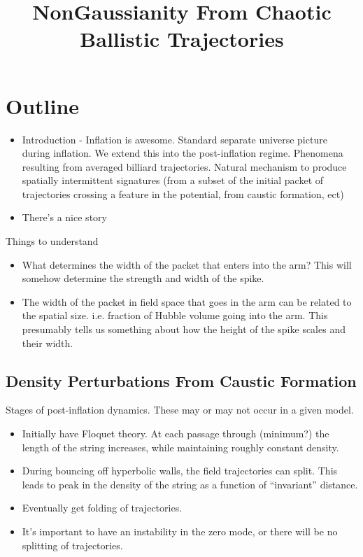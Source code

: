 \documentclass[11pt,a4paper]{article}
\begin{document}
\title{NonGaussianity From Chaotic Ballistic Trajectories}

\maketitle

\section{Outline}
\begin{itemize}
\item Introduction - Inflation is awesome.  Standard separate universe picture during inflation.  We extend this into the post-inflation regime.  Phenomena resulting from averaged billiard trajectories.  Natural mechanism to produce spatially intermittent signatures (from a subset of the initial packet of trajectories crossing a feature in the potential, from caustic formation, ect)
\item There's a nice story 
\end{itemize}










Things to understand
\begin{itemize}
\item What determines the width of the packet that enters into the arm?  This will somehow determine the strength and width of the spike.
\item The width of the packet in field space that goes in the arm can be related to the spatial size.  i.e. fraction of Hubble volume going into the arm.  This presumably tells us something about how the height of the spike scales and their width.
\end{itemize}

\subsection{Density Perturbations From Caustic Formation}
Stages of post-inflation dynamics.  These may or may not occur in a given model.
\begin{itemize}
\item Initially have Floquet theory.  At each passage through (minimum?) the length of the string increases, while maintaining roughly constant density.
\item During bouncing off hyperbolic walls, the field trajectories can split.  This leads to peak in the density of the string as a function of ``invariant'' distance.
\item Eventually get folding of trajectories.
\item It's important to have an instability in the zero mode, or there will be no splitting of trajectories.
\end{itemize}
\end{document}
